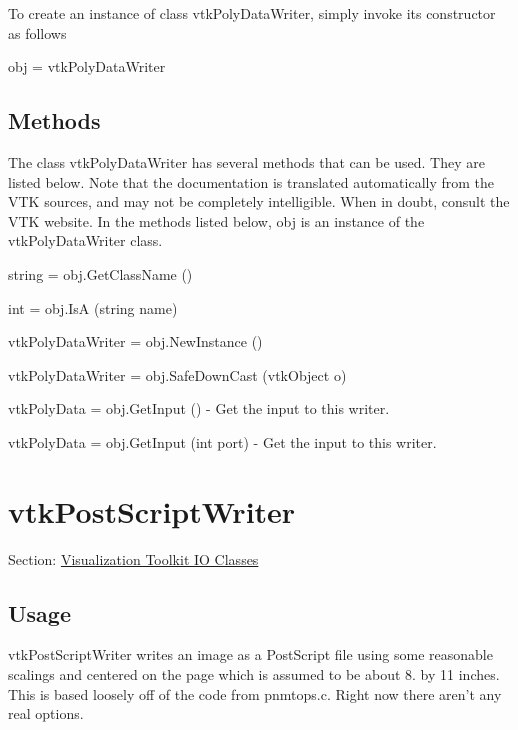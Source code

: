 To create an instance of class vtk\-Poly\-Data\-Writer, simply invoke its constructor as follows \begin{DoxyVerb}  obj = vtkPolyDataWriter
\end{DoxyVerb}
 \hypertarget{vtkwidgets_vtkxyplotwidget_Methods}{}\subsection{Methods}\label{vtkwidgets_vtkxyplotwidget_Methods}
The class vtk\-Poly\-Data\-Writer has several methods that can be used. They are listed below. Note that the documentation is translated automatically from the V\-T\-K sources, and may not be completely intelligible. When in doubt, consult the V\-T\-K website. In the methods listed below, {\ttfamily obj} is an instance of the vtk\-Poly\-Data\-Writer class. 
\begin{DoxyItemize}
\item {\ttfamily string = obj.\-Get\-Class\-Name ()}  
\item {\ttfamily int = obj.\-Is\-A (string name)}  
\item {\ttfamily vtk\-Poly\-Data\-Writer = obj.\-New\-Instance ()}  
\item {\ttfamily vtk\-Poly\-Data\-Writer = obj.\-Safe\-Down\-Cast (vtk\-Object o)}  
\item {\ttfamily vtk\-Poly\-Data = obj.\-Get\-Input ()} -\/ Get the input to this writer.  
\item {\ttfamily vtk\-Poly\-Data = obj.\-Get\-Input (int port)} -\/ Get the input to this writer.  
\end{DoxyItemize}\hypertarget{vtkio_vtkpostscriptwriter}{}\section{vtk\-Post\-Script\-Writer}\label{vtkio_vtkpostscriptwriter}
Section\-: \hyperlink{sec_vtkio}{Visualization Toolkit I\-O Classes} \hypertarget{vtkwidgets_vtkxyplotwidget_Usage}{}\subsection{Usage}\label{vtkwidgets_vtkxyplotwidget_Usage}
vtk\-Post\-Script\-Writer writes an image as a Post\-Script file using some reasonable scalings and centered on the page which is assumed to be about 8. by 11 inches. This is based loosely off of the code from pnmtops.\-c. Right now there aren't any real options.


